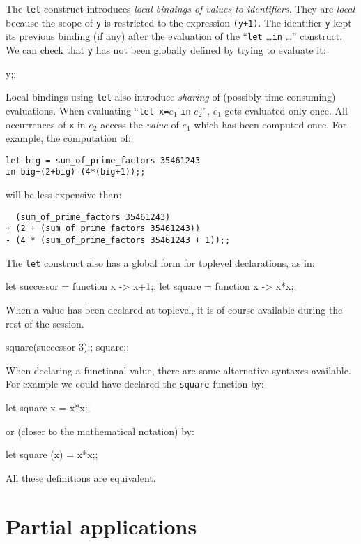 The \verb|let| construct introduces {\em local bindings of values to
identifiers}. They are {\em local} because the scope of {\tt y} is
restricted to the expression \verb|(y+1)|. The identifier {\tt y} kept
its previous binding (if any) after the evaluation of the ``{\tt let}
\ldots {\tt in} \ldots'' construct. We can check that \verb|y| has not
been globally defined by trying to evaluate it:
\begin{caml_example}
y;;
\end{caml_example}
Local bindings using {\tt let} also introduce {\em sharing} of
(possibly time-consuming) evaluations. When evaluating ``{\tt let
x=}$e_1$ {\tt in} $e_2$'', $e_1$ gets evaluated only once.  All
occurrences of {\tt x} in $e_2$ access the {\em value} of $e_1$ which
has been computed once.  For example, the computation of:
\begin{verbatim}
let big = sum_of_prime_factors 35461243
in big+(2+big)-(4*(big+1));;
\end{verbatim}
will be less expensive than:
\begin{verbatim}
  (sum_of_prime_factors 35461243)
+ (2 + (sum_of_prime_factors 35461243))
- (4 * (sum_of_prime_factors 35461243 + 1));;
\end{verbatim}
The \verb|let| construct also has  a global form for toplevel declarations, as
in:
\begin{caml_example}
let successor = function x -> x+1;;
let square = function x -> x*x;;
\end{caml_example}
When a value has been declared at toplevel, it is of course available during
the rest of the session.
\begin{caml_example}
square(successor 3);;
square;;
\end{caml_example}

When declaring a functional value, there are some alternative syntaxes
available.
For example we could have declared the \verb|square| function
by:
\begin{caml_example}
let square x = x*x;;
\end{caml_example}
or (closer to the mathematical notation) by:
\begin{caml_example}
let square (x) = x*x;;
\end{caml_example}
All these definitions are equivalent.


\section{Partial applications}


